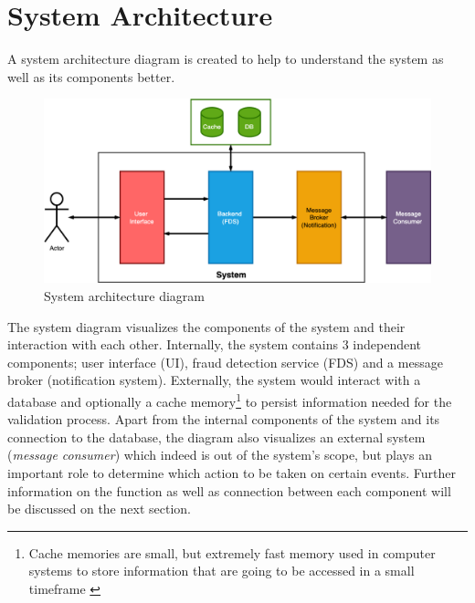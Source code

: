 \section{System Architecture}

A system architecture diagram is created to help to understand the system as well as its components better. 

\begin{figure}[h]
 \includegraphics[width=\textwidth]{diagrams/system.png}
 \caption{System architecture diagram}
\end{figure}
 
The system diagram visualizes the components of the system and their interaction with each other. Internally, the system contains 3 independent components; user interface (UI), fraud detection service (FDS) and a message broker (notification system). 
Externally, the system would interact with a database and optionally a cache memory\footnote{Cache memories are small, but extremely fast memory used in computer systems to store information that are going to be accessed in a small timeframe \autocite{smith-1982}}  to persist information needed for the validation process. Apart from the internal components of the system and its connection to the database, the diagram also visualizes an external system (\emph{message consumer}) which indeed is out of the system's scope, but plays an important role to determine which action to be taken on certain events. Further information on the function as well as connection between each component will be discussed on the next section.